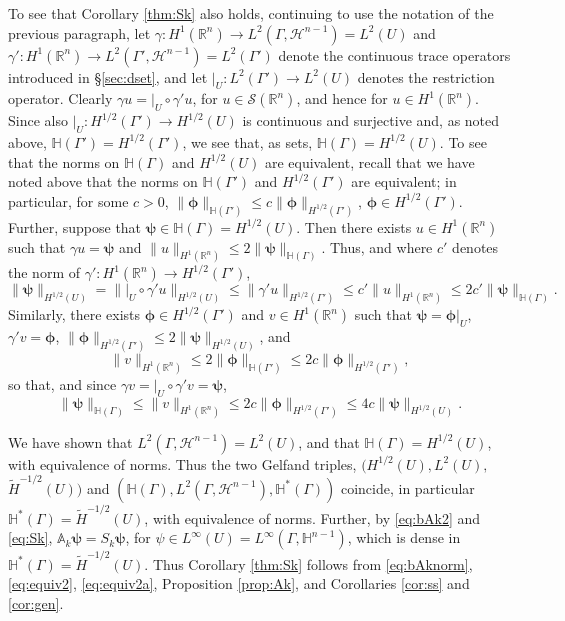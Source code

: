 \documentclass{birkjour}
\theoremstyle{definition}
\theoremstyle{remark}
\numberwithin{equation}{section}
\newcommand{\R}{\mathbb{R}}
\newcommand{\cS}{\mathcal{S}}
\newcommand{\cH}{\mathcal{H}}
\newcommand{\bA}{\mathbb{A}}
\newcommand{\bH}{\mathbb{H}}
\newcommand{\bphi}{\boldsymbol{\phi}}
\newcommand{\bpsi}{\boldsymbol{\psi}}
\begin{document}
To see that Corollary \ref{thm:Sk} also holds, continuing to use the notation of the previous paragraph, let $\gamma:H^1(\R^n)\to L^2(\Gamma,\cH^{n-1})=L^2(U)$ and $\gamma':H^1(\R^n)\to L^2(\Gamma',\cH^{n-1})=L^2(\Gamma')$ denote the continuous trace operators introduced in \S\ref{sec:dset}, and let $|_{U}:L^2(\Gamma')\to L^2(U)$ denotes the restriction operator.  Clearly $\gamma u = |_U\circ \gamma'u$, for $u\in \cS(\R^n)$, and hence for $u\in H^1(\R^n)$. Since also $|_{U}:H^{1/2}(\Gamma')\to H^{1/2}(U)$ is continuous and surjective and, as noted above, $\bH(\Gamma')=H^{1/2}(\Gamma')$, we see that, as sets, $\bH(\Gamma)=H^{1/2}(U)$. To see that the norms on $\bH(\Gamma)$ and $H^{1/2}(U)$ are equivalent, recall that we have noted above that the norms on $\bH(\Gamma')$ and $H^{1/2}(\Gamma')$ are equivalent; in particular, for some $c>0$, $\|\bphi\|_{\bH(\Gamma')} \leq c\|\bphi\|_{H^{1/2}(\Gamma')}$, $\bphi\in H^{1/2}(\Gamma')$. Further,
suppose that $\bpsi \in \bH(\Gamma)=H^{1/2}(U)$. Then there exists $u\in H^1(\R^n)$ such that $\gamma u = \bpsi$ and
$\|u\|_{H^1(\R^n)} \leq 2\|\bpsi\|_{\bH(\Gamma)}$. Thus, and where $c'$ denotes the norm of $\gamma':H^1(\R^n)\to H^{1/2}(\Gamma')$,  
$$
\|\bpsi\|_{H^{1/2}(U)} = \| |_U\circ \gamma' u\|_{H^{1/2}(U)} \leq \|\gamma'u\|_{H^{1/2}(\Gamma')} \leq c' \|u\|_{H^1(\R^n)} \leq 2c'\|\bpsi\|_{\bH(\Gamma)}.
$$ 
Similarly, there exists $\bphi\in H^{1/2}(\Gamma')$ and $v\in H^1(\R^n)$ such that $\bpsi = \bphi|_U$, $\gamma' v=\bphi$, $\|\bphi\|_{H^{1/2}(\Gamma')} \leq 2 \|\bpsi\|_{H^{1/2}(U)}$, and 
$$
\|v\|_{H^1(\R^n)}\leq 2\|\bphi\|_{\bH(\Gamma')} \leq 2c\|\bphi\|_{H^{1/2}(\Gamma')},
$$
so that, and since $\gamma v = |_U\circ \gamma' v = \bpsi$,
$$
\|\bpsi\|_{\bH(\Gamma)} \leq \|v\|_{H^1(\R^n)}  \leq 2c\|\bphi\|_{H^{1/2}(\Gamma')} \leq 4c\|\bpsi\|_{H^{1/2}(U)}.
$$

We have shown that $L^2(\Gamma, \cH^{n-1})=L^2(U)$, and that $\bH(\Gamma)=H^{1/2}(U)$, with equivalence of norms. Thus the two Gelfand triples, $(H^{1/2}(U),L^2(U),$ $\widetilde H^{-1/2}(U))$ and $(\bH(\Gamma),L^2(\Gamma,\cH^{n-1}),\bH^*(\Gamma))$ coincide, in particular $\bH^*(\Gamma)=\widetilde H^{-1/2}(U)$, with equivalence of norms. Further, by \eqref{eq:bAk2} and \eqref{eq:Sk}, $\bA_k\bpsi=S_k\bpsi$, for $\psi\in L^\infty(U)=L^\infty(\Gamma,\bH^{n-1})$, which is dense in $\bH^*(\Gamma)=\widetilde H^{-1/2}(U)$. Thus Corollary \ref{thm:Sk} follows from \eqref{eq:bAknorm}, \eqref{eq:equiv2}, \eqref{eq:equiv2a}, Proposition \ref{prop:Ak}, and Corollaries \ref{cor:ss} and \ref{cor:gen}.
\end{document}
